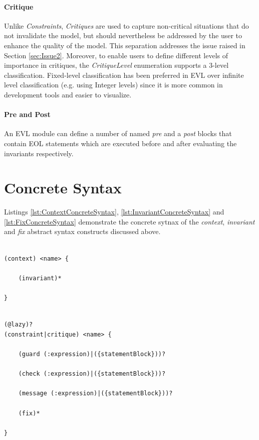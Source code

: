 \paragraph{Critique}
Unlike \emph{Constraints}, \emph{Critiques} are used to capture non-critical situations that do not invalidate the model, but should nevertheless be addressed by the user to enhance the quality of the model. This separation addresses the issue raised in Section \ref{sec:Issue2}. Moreover, to enable users to define different levels of importance in critiques, the \emph{CritiqueLevel} enumeration supports a 3-level classification. Fixed-level classification has been preferred in EVL over infinite level classification (e.g. using Integer levels) since it is more common in development tools and easier to visualize.

\paragraph{Pre and Post}
An EVL module can define a number of named \emph{pre} and a \emph{post} blocks that contain EOL statements which are executed before and after evaluating the invariants respectively.

\section{Concrete Syntax}

Listings \ref{lst:ContextConcreteSyntax}, \ref{lst:InvariantConcreteSyntax} and \ref{lst:FixConcreteSyntax} demonstrate the concrete sytnax of the \emph{context}, \emph{invariant} and \emph{fix} abstract syntax constructs discussed above.

\begin{lstlisting}[basicstyle=\ttfamily\footnotesize, flexiblecolumns=true, numbers=none, nolol=true, caption=Concrete Syntax of an EVL context, label=lst:ContextConcreteSyntax, language=EVL, numbers=left, tabsize=2]

(context) <name> {
	
	(invariant)*
	
}
\end{lstlisting}

\begin{lstlisting}[basicstyle=\ttfamily\footnotesize, flexiblecolumns=true, numbers=none, nolol=true, caption=Concrete Syntax of an EVL invariant, label=lst:InvariantConcreteSyntax, language=EVL, numbers=left, tabsize=2]

(@lazy)?
(constraint|critique) <name> {
	
	(guard (:expression)|({statementBlock}))?
	
	(check (:expression)|({statementBlock}))?
	
	(message (:expression)|({statementBlock}))?
	
	(fix)*
	
}
\end{lstlisting}


